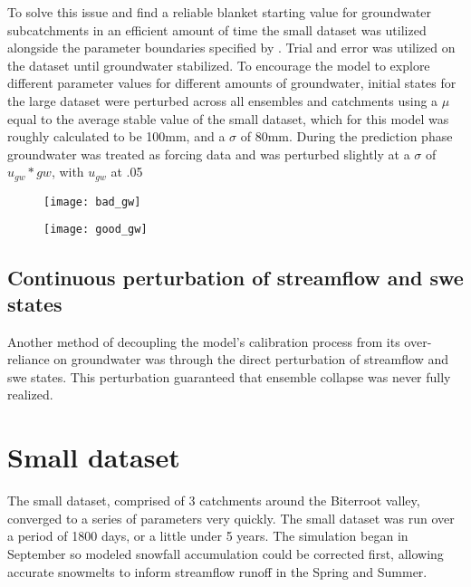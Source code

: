 To solve this issue and find a reliable blanket starting value for groundwater subcatchments in an efficient amount of time the small dataset was utilized alongside the parameter boundaries specified by \cite{Maneta2008}. Trial and error was utilized on the dataset until groundwater stabilized. To encourage the model to explore different parameter values for different amounts of groundwater, initial states for the large dataset were perturbed across all ensembles and catchments using a $\mu$ equal to the average stable value of the small dataset, which for this model was roughly calculated to be 100mm, and a $\sigma$ of 80mm. During the prediction phase groundwater was treated as forcing data and was perturbed slightly at a $\sigma$ of $u_{gw} * gw$, with $u_{gw}$  at .05%

\begin{figure}
\centering
\begin{minipage}{.5\textwidth}
  \centering
  \texttt{[image: bad\_gw]}
  \label{fig:bad_gw}
\end{minipage}%
\begin{minipage}{.5\textwidth}
  \centering
  \texttt{[image: good\_gw]}
  \label{fig:good_gw}
\end{minipage}
\end{figure}


\subsection{Continuous perturbation of streamflow and swe states}

Another method of decoupling the model's calibration process from its over-reliance on groundwater was through the direct perturbation of streamflow and swe states. This perturbation guaranteed that ensemble collapse was never fully realized.


\section{Small dataset}

The small dataset, comprised of 3 catchments around the Biterroot valley, converged to a series of parameters very quickly. The small dataset was run over a period of 1800 days, or a little under 5 years. The simulation began in September so modeled snowfall accumulation could be corrected first, allowing accurate snowmelts to inform streamflow runoff in the Spring and Summer. 


